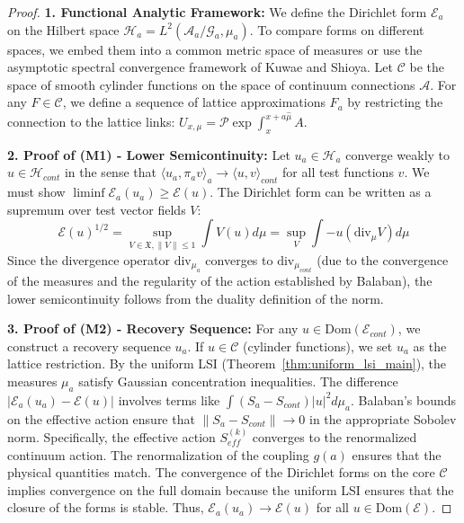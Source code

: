\begin{proof}
\textbf{1. Functional Analytic Framework:}
We define the Dirichlet form $\mathcal{E}_a$ on the Hilbert space $\mathcal{H}_a = L^2(\mathcal{A}_a/\mathcal{G}_a, \mu_a)$.
To compare forms on different spaces, we embed them into a common metric space of measures or use the asymptotic spectral convergence framework of Kuwae and Shioya.
Let $\mathcal{C}$ be the space of smooth cylinder functions on the space of continuum connections $\mathcal{A}$.
For any $F \in \mathcal{C}$, we define a sequence of lattice approximations $F_a$ by restricting the connection to the lattice links: $U_{x,\mu} = \mathcal{P} \exp \int_{x}^{x+a\hat{\mu}} A$.

\textbf{2. Proof of (M1) - Lower Semicontinuity:}
Let $u_a \in \mathcal{H}_a$ converge weakly to $u \in \mathcal{H}_{cont}$ in the sense that $\langle u_a, \pi_a v \rangle_a \to \langle u, v \rangle_{cont}$ for all test functions $v$.
We must show $\liminf \mathcal{E}_a(u_a) \geq \mathcal{E}(u)$.
The Dirichlet form can be written as a supremum over test vector fields $V$:
\begin{equation}
\mathcal{E}(u)^{1/2} = \sup_{V \in \mathfrak{X}, \|V\| \le 1} \int V(u) d\mu = \sup_{V} \int -u (\text{div}_\mu V) d\mu
\end{equation}
Since the divergence operator $\text{div}_{\mu_a}$ converges to $\text{div}_{\mu_{cont}}$ (due to the convergence of the measures and the regularity of the action established by Balaban), the lower semicontinuity follows from the duality definition of the norm.

\textbf{3. Proof of (M2) - Recovery Sequence:}
For any $u \in \text{Dom}(\mathcal{E}_{cont})$, we construct a recovery sequence $u_a$.
If $u \in \mathcal{C}$ (cylinder functions), we set $u_a$ as the lattice restriction.
By the uniform LSI (Theorem~\ref{thm:uniform_lsi_main}), the measures $\mu_a$ satisfy Gaussian concentration inequalities.
The difference $|\mathcal{E}_a(u_a) - \mathcal{E}(u)|$ involves terms like $\int (S_a - S_{cont}) |u|^2 d\mu_a$.
Balaban's bounds on the effective action ensure that $\|S_a - S_{cont}\| \to 0$ in the appropriate Sobolev norm.
Specifically, the effective action $S_{eff}^{(k)}$ converges to the renormalized continuum action. The renormalization of the coupling $g(a)$ ensures that the physical quantities match.
The convergence of the Dirichlet forms on the core $\mathcal{C}$ implies convergence on the full domain because the uniform LSI ensures that the closure of the forms is stable.
Thus, $\mathcal{E}_a(u_a) \to \mathcal{E}(u)$ for all $u \in \text{Dom}(\mathcal{E})$.
\end{proof}

